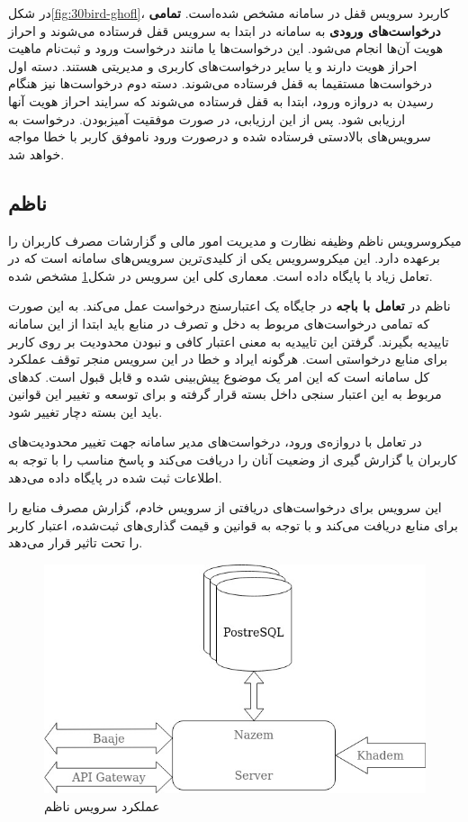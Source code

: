 در شکل\ref{fig:30bird-ghofl}، کاربرد سرویس قفل در سامانه مشخص شده‌است. \textbf{تمامی درخواست‌های ورودی} به سامانه در ابتدا به سرویس قفل فرستاده می‌شوند و احراز هویت آن‌ها انجام می‌شود. این درخواست‌ها یا مانند درخواست ورود و ثبت‌نام ماهیت احراز هویت دارند و یا سایر درخواست‌های کاربری و مدیریتی هستند. دسته اول درخواست‌ها مستقیما به قفل فرستاده می‌شوند. دسته دوم درخواست‌ها نیز هنگام رسیدن به دروازه ‌ورود، ابتدا به قفل فرستاده می‌شوند که سرایند احراز هویت  آنها ارزیابی شود. پس از این ارزیابی، در صورت موفقیت آمیز‌بودن. درخواست به سرویس‌های بالادستی فرستاده شده و درصورت ورود ناموفق کاربر با خطا مواجه خواهد شد.


\subsection{ناظم}
میکروسرویس ناظم وظیفه نظارت و مدیریت امور مالی و گزارشات مصرف کاربران را برعهده دارد. این میکروسرویس یکی از کلیدی‌ترین سرویس‌های سامانه است که در تعامل زیاد با پایگاه داده است. معماری کلی این سرویس در شکل\ref{fig:30bird-nazem} مشخص شده.

ناظم در \textbf{تعامل با باجه} در جایگاه یک اعتبارسنج درخواست عمل می‌کند. به این صورت که تمامی درخواست‌های مربوط به دخل و تصرف در منابع باید ابتدا از این سامانه تاییدیه بگیرند. گرفتن این تاییدیه به معنی اعتبار کافی و نبودن محدودیت بر روی کاربر برای منابع درخواستی است. هرگونه ایراد و خطا در این سرویس منجر توقف عملکرد کل سامانه است که این امر یک موضوع پیش‌بینی شده و قابل قبول است. کد‌های مربوط به این اعتبار سنجی داخل بسته  قرار گرفته و برای توسعه و تغییر این قوانین باید این بسته دچار تغییر شود.

در تعامل با ‌دروازه‌ی ورود، درخواست‌های مدیر سامانه جهت تغییر محدودیت‌های کاربران یا گزارش گیری از وضعیت آنان را دریافت می‌کند و پاسخ مناسب را با توجه به اطلاعات ثبت شده در پایگاه داده می‌دهد.

این سرویس برای درخواست‌های دریافتی از سرویس خادم، گزارش مصرف منابع را برای منابع دریافت می‌کند و با توجه به قوانین و قیمت گذاری‌های ثبت‌شده، اعتبار کاربر را تحت تاثیر قرار می‌دهد.

\begin{figure}
	\vspace{1cm}
	\centering
	\includegraphics[scale=0.7]{figures/30bird-nazem.jpg}
	\caption{عملکرد سرویس ناظم}
	\label{fig:30bird-nazem}
\end{figure}


